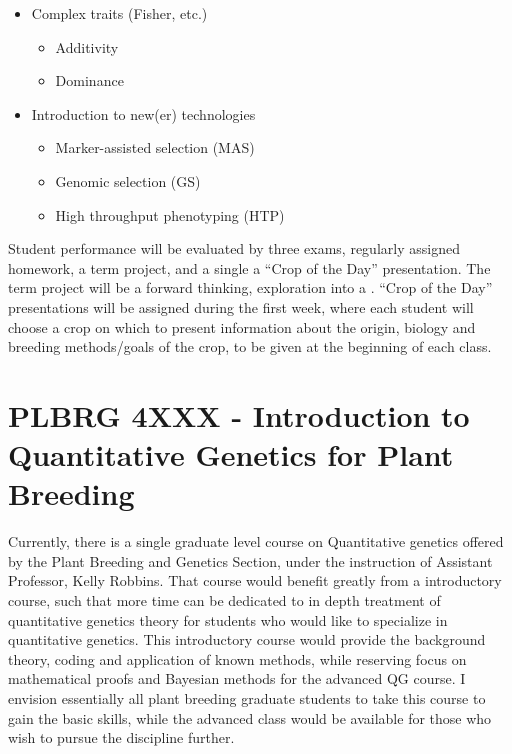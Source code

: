 \documentclass[10pt]{article}
\begin{document}
\begin{itemize}
	\item Complex traits (Fisher, etc.)
	\begin{itemize}
		\item Additivity
		\item Dominance
	\end{itemize} 

	\item Introduction to new(er) technologies
	\begin{itemize}
		\item Marker-assisted selection (MAS)
		\item Genomic selection (GS)
		\item High throughput phenotyping (HTP)
	\end{itemize} 

\end{itemize}

Student performance will be evaluated by three exams, regularly assigned homework, a term project, and a single a ``Crop of the Day'' presentation. The term project will be a forward thinking, exploration into a . ``Crop of the Day'' presentations will be assigned during the first week, where each student will choose a crop on which to present information about the origin, biology and breeding methods/goals of the crop, to be given at the beginning of each class.


\section*{PLBRG 4XXX - Introduction to Quantitative Genetics for Plant Breeding }

Currently, there is a single graduate level course on Quantitative genetics offered by the Plant Breeding and Genetics Section, under the instruction of Assistant Professor, Kelly Robbins. That course would benefit greatly from a introductory course, such that more time can be dedicated to in depth treatment of quantitative genetics theory for students who would like to specialize in quantitative genetics. This introductory course would provide the background theory, coding and application of known methods, while reserving focus on mathematical proofs and Bayesian methods for the advanced QG course. I envision essentially all plant breeding graduate students to take this course to gain the basic skills, while the advanced class would be available for those who wish to pursue the discipline further. 
\end{document}
